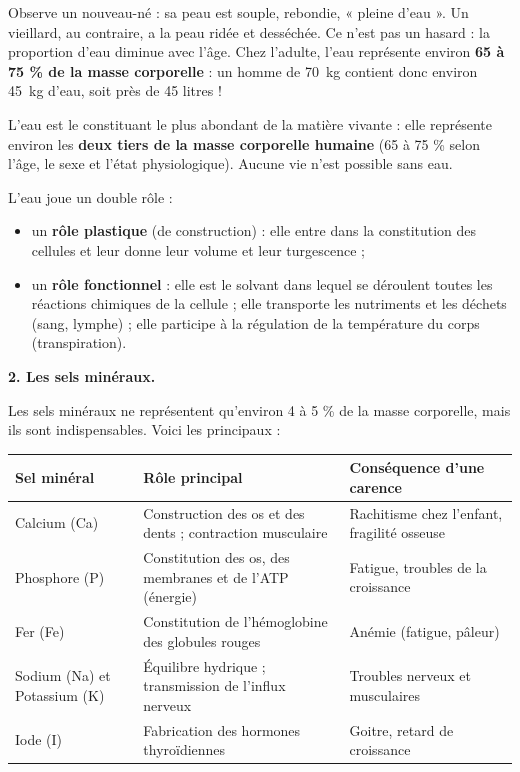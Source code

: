 \documentclass[11pt]{article}
\begin{document}
Observe un nouveau-né : sa peau est souple, rebondie, « pleine d'eau ». Un vieillard, au contraire, a la peau ridée et desséchée. Ce n'est pas un hasard : la proportion d'eau diminue avec l'âge. Chez l'adulte, l'eau représente environ \textbf{65 à 75 \% de la masse corporelle} : un homme de \SI{70}{kg} contient donc environ \SI{45}{kg} d'eau, soit près de 45 litres !

\begin{propriete}
L'eau est le constituant le plus abondant de la matière vivante : elle représente environ les \textbf{deux tiers de la masse corporelle humaine} (65 à 75 \% selon l'âge, le sexe et l'état physiologique). Aucune vie n'est possible sans eau.
\end{propriete}

L'eau joue un double rôle :
\begin{itemize}
\item un \textbf{rôle plastique} (de construction) : elle entre dans la constitution des cellules et leur donne leur volume et leur turgescence ;
\item un \textbf{rôle fonctionnel} : elle est le solvant dans lequel se déroulent toutes les réactions chimiques de la cellule ; elle transporte les nutriments et les déchets (sang, lymphe) ; elle participe à la régulation de la température du corps (transpiration).
\end{itemize}

\textbf{2. Les sels minéraux.}

Les sels minéraux ne représentent qu'environ 4 à 5 \% de la masse corporelle, mais ils sont indispensables. Voici les principaux :

\begin{center}
\begin{tabularx}{\linewidth}{|l|X|X|}
\hline
\rowcolor{popblueL} \textbf{Sel minéral} & \textbf{Rôle principal} & \textbf{Conséquence d'une carence} \\
\hline
Calcium (Ca) & Construction des os et des dents ; contraction musculaire & Rachitisme chez l'enfant, fragilité osseuse \\
\hline
Phosphore (P) & Constitution des os, des membranes et de l'ATP (énergie) & Fatigue, troubles de la croissance \\
\hline
Fer (Fe) & Constitution de l'hémoglobine des globules rouges & Anémie (fatigue, pâleur) \\
\hline
Sodium (Na) et Potassium (K) & Équilibre hydrique ; transmission de l'influx nerveux & Troubles nerveux et musculaires \\
\hline
Iode (I) & Fabrication des hormones thyroïdiennes & Goitre, retard de croissance \\
\hline
\end{tabularx}
\end{center}
\end{document}
